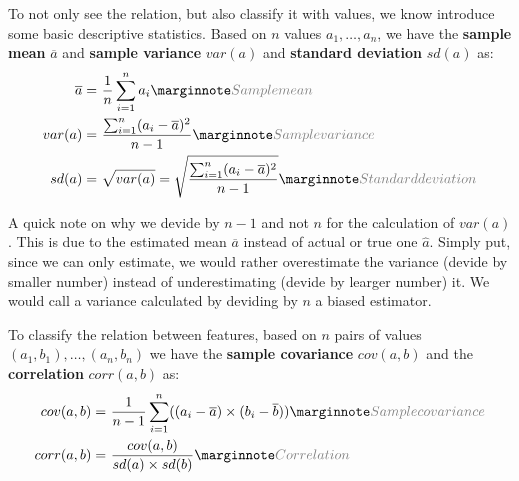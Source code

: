 To not only see the relation, but also classify it with values, we know introduce some basic descriptive statistics. Based on $n$ values $a_1, \dots, a_n$, we have the \textbf{sample mean} $\overline{a}$ and \textbf{sample variance} $var(a)$ and \textbf{standard deviation} $sd(a)$ as:
\begin{align*}
  \overline{a} = &\ \frac{1}{n}\sum_{i=1}^n a_i\sidenote{Sample mean}\allowdisplaybreaks\\
  var(a) = &\ \frac{\sum_{i=1}^n (a_i - \overline{a})^2}{n-1}\sidenote{Sample variance}\allowdisplaybreaks\\
  sd(a) = &\ \sqrt{var(a)} = \sqrt{\frac{\sum_{i=1}^n (a_i - \overline{a})^2}{n-1}}\sidenote{Standard deviation}
\end{align*}

A quick note on why we devide by $n-1$ and not $n$ for the calculation of $var(a)$. This is due to the estimated mean $\overline{a}$ instead of actual or true one $\hat{a}$. Simply put, since we can only estimate, we would rather overestimate the variance (devide by smaller number) instead of underestimating (devide by learger number) it. We would call a variance calculated by deviding by $n$ a biased estimator.

To classify the relation between features, based on $n$ pairs of values $(a_1, b_1), \dots, (a_n, b_n)$ we have the \textbf{sample covariance} $cov(a, b)$ and the \textbf{correlation} $corr(a, b)$ as: 
\begin{align*}
  cov(a, b) = &\ \frac{1}{n-1}\sum_{i=1}^n ((a_i - \overline{a})\times(b_i - \overline{b}))\sidenote{Sample covariance}\allowdisplaybreaks\\
  corr(a, b) = &\ \frac{cov(a, b)}{sd(a)\times sd(b)}\sidenote{Correlation}
\end{align*}

